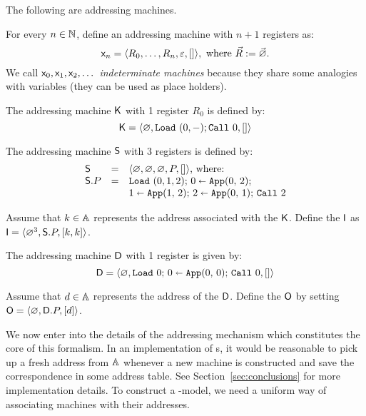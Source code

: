 \begin{exas}\label{ex:ilprimoesempiononsiscordamai}
The following are addressing machines.
\bsub
\item\label{ex:ilprimoesempiononsiscordamai1}
	For every $n\in\nat$, define an addressing machine with $n+1$ registers as:
\[
	\mach{x}_n = \tuple{R_0,\dots,R_n,\varepsilon,[]},\textrm{ where }\vec R := \vec \Null.
\]
We call $\mach{x}_0,\mach{x}_1,\mach{x}_2,\dots$ \emph{indeterminate machines} because they share some analogies with variables (they can be used as place holders).
\item
The addressing machine $\mK$ with 1 register $R_0$ is defined by:
\[
	\mK = \tuple{\Null,\RaS (0,-); \Call 0,[]}
\]
\item The addressing machine $\mS$ with 3 registers is defined by:
\[
	\begin{array}{lcl}
	\mS &=& \tuple{\Null,\Null,\Null,P,[]}\textrm{, where:}\\
	\mS.P &=& \RaS (0, 1,2);\,\Apply 020;\\
	&&\Apply 121;\,\Apply 012;\,\Call 2\\
	\end{array}
\]
\item Assume that $k\in\Addrs$ represents the address associated with the \am{} $\mK$.
Define the \am{} $\mach{I}$ as $\mach{I} = \tuple{\Null^3,\mS.P,[k,k]}$.
\item The addressing machine $\mach{D}$ with 1 register is given by:
\[
	\mach{D} = \tuple{\Null,\RaS 0;\,\Apply 000;\,\Call 0,[]}
\]
\item Assume that $d\in\Addrs$ represents the address of the \am{} $\mach{D}$.
Define the \am{} $\mach{O}$ by setting $\mach{O} = \tuple{\Null,\mach{D}.P,[d]}$.
\esub
\end{exas}

\noindent
We now enter into the details of the addressing mechanism which constitutes the core of this formalism.
In an implementation of \am s, it would be reasonable to pick up a fresh address from $\Addrs$ whenever a new machine is constructed and save the correspondence in some address table. See Section~\ref{sec:conclusions} for more implementation details.
To construct a \lam-model, we need a uniform way of associating machines with their addresses.


